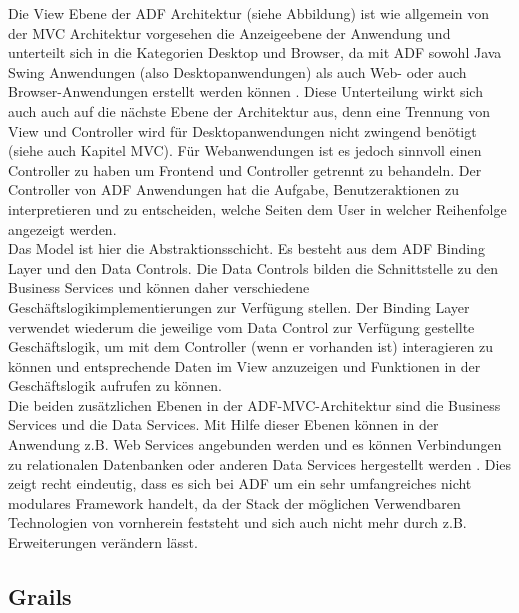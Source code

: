 Die View Ebene der ADF Architektur (siehe Abbildung) ist wie allgemein von der MVC Architektur vorgesehen die Anzeigeebene der Anwendung und unterteilt sich in die Kategorien Desktop und Browser, da mit ADF sowohl Java Swing Anwendungen (also Desktopanwendungen) als auch Web- oder auch Browser-Anwendungen erstellt werden können \autocite[S.22]{AUW2009}. Diese Unterteilung wirkt sich auch auch auf die nächste Ebene der Architektur aus, denn eine Trennung von View und Controller wird für Desktopanwendungen nicht zwingend benötigt (siehe auch Kapitel MVC). Für Webanwendungen ist es jedoch sinnvoll einen Controller zu haben um Frontend und Controller getrennt zu behandeln. Der Controller von ADF Anwendungen hat die Aufgabe, Benutzeraktionen zu interpretieren und zu entscheiden, welche Seiten dem User in welcher Reihenfolge angezeigt werden\autocite[S.12]{OAEAD2014}.\\
Das Model ist hier die Abstraktionsschicht. Es besteht aus dem ADF Binding Layer und den Data Controls. Die Data Controls bilden die Schnittstelle zu den Business Services und können daher verschiedene Geschäftslogikimplementierungen zur Verfügung stellen. Der Binding Layer verwendet wiederum die jeweilige vom Data Control zur Verfügung gestellte Geschäftslogik, um mit dem Controller (wenn er vorhanden ist) interagieren zu können und entsprechende Daten im View anzuzeigen und Funktionen in der Geschäftslogik aufrufen zu können. \autocite[S.6]{ARIA2015}\\
Die beiden zusätzlichen Ebenen in der ADF-MVC-Architektur sind die Business Services und die Data Services. Mit Hilfe dieser Ebenen können in der Anwendung z.B. Web Services angebunden werden und es können Verbindungen zu relationalen Datenbanken oder anderen Data Services hergestellt werden \autocite[S.13]{OAEAD2014}. Dies zeigt recht eindeutig, dass es sich bei ADF um ein sehr umfangreiches nicht modulares Framework handelt, da der Stack der möglichen Verwendbaren Technologien von vornherein feststeht und sich auch nicht mehr durch z.B. Erweiterungen verändern lässt.

\subsection{Grails}
